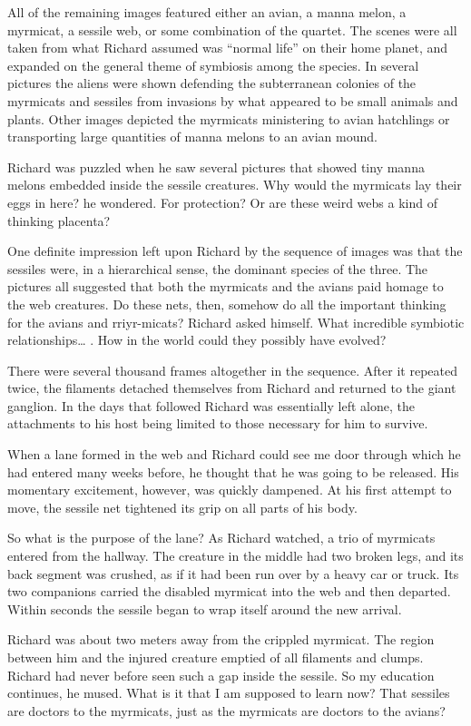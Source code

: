 \documentclass[]{article}
\begin{document}
{{All of the remaining images featured either an avian, a manna melon, a myrmicat, a sessile web, or some combination of the quartet.  The scenes were all taken from what Richard assumed was “normal life” on their home planet, and expanded on the general theme of symbiosis among the species.  In several pictures the aliens were shown defending the subterranean colonies of the myrmicats and sessiles from invasions by what appeared to be small animals and plants.  Other images depicted the myrmicats ministering to avian hatchlings or transporting large quantities of manna melons to an avian mound.

Richard was puzzled when he saw several pictures that showed tiny manna melons embedded inside the sessile creatures.  Why would the myrmicats lay their eggs in here? he wondered.  For protection? Or are these weird webs a kind of thinking placenta?

One definite impression left upon Richard by the sequence of images was that the sessiles were, in a hierarchical sense, the dominant species of the three.  The pictures all suggested that both the myrmicats and the avians paid homage to the web creatures.  Do these nets, then, somehow do all the important thinking for the avians and rriyr-micats? Richard asked himself.  What incredible symbiotic relationships… .  How in the world could they possibly have evolved?

There were several thousand frames altogether in the sequence.  After it repeated twice, the filaments detached themselves from Richard and returned to the giant ganglion.  In the days that followed Richard was essentially left alone, the attachments to his host being limited to those necessary for him to survive.

When a lane formed in the web and Richard could see me door through which he had entered many weeks before, he thought that he was going to be released.  His momentary excitement, however, was quickly dampened.  At his first attempt to move, the sessile net tightened its grip on all parts of his body.

So what is the purpose of the lane? As Richard watched, a trio of myrmicats entered from the hallway.  The creature in the middle had two broken legs, and its back segment was crushed, as if it had been run over by a heavy car or truck.  Its two companions carried the disabled myrmicat into the web and then departed.  Within seconds the sessile began to wrap itself around the new arrival.

Richard was about two meters away from the crippled myrmicat.  The region between him and the injured creature emptied of all filaments and clumps.  Richard had never before seen such a gap inside the sessile.  So my education continues, he mused.  What is it that I am supposed to learn now? That sessiles are doctors to the myrmicats, just as the myrmicats are doctors to the avians?

}}
\end{document}
